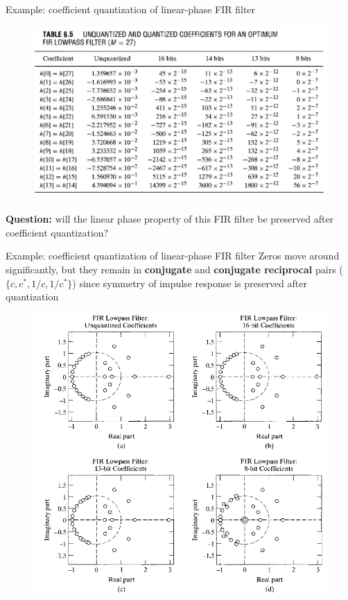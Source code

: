 \documentclass[10pt, handout]{beamer}
\begin{document}
%
\begin{frame}{Example: coefficient quantization of linear-phase FIR filter}
	\begin{figure}
		\centering
		\includegraphics[scale=0.35]{figs/fir_quantized_coefficients.png}
	\end{figure}
	\pause
	\textbf{Question:} will the linear phase property of this FIR filter be preserved after coefficient quantization?
\end{frame}


\begin{frame}{Example: coefficient quantization of linear-phase FIR filter}
	Zeros move around significantly, but they remain in \textbf{conjugate} and \textbf{conjugate reciprocal}  pairs ($\{c, c^*, 1/c, 1/c^*\}$) since symmetry of impulse response is preserved after quantization
	\begin{figure}
		\centering
		\includegraphics[scale=0.33]{figs/pole_zero_fir_quantized.png}
	\end{figure}
\end{frame}
\end{document}
